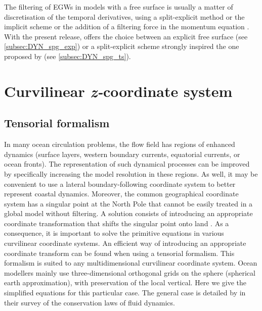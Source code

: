 \documentclass[../main/NEMO_manual]{subfiles}
\begin{document}
The filtering of EGWs in models with a free surface is usually a matter of discretisation of
the temporal derivatives,
using a split-explicit method \citep{Killworth_al_JPO91, Zhang_Endoh_JGR92} or
the implicit scheme \citep{Dukowicz1994} or
the addition of a filtering force in the momentum equation \citep{Roullet_Madec_JGR00}.
With the present release, \NEMO offers the choice between
an explicit free surface (see \autoref{subsec:DYN_spg_exp}) or
a split-explicit scheme strongly inspired the one proposed by \citet{Shchepetkin_McWilliams_OM05}
(see \autoref{subsec:DYN_spg_ts}).

\section{Curvilinear \textit{z-}coordinate system}
\label{sec:PE_zco}

\subsection{Tensorial formalism}
\label{subsec:PE_tensorial}

In many ocean circulation problems, the flow field has regions of enhanced dynamics
(\ie surface layers, western boundary currents, equatorial currents, or ocean fronts).
The representation of such dynamical processes can be improved by
specifically increasing the model resolution in these regions.
As well, it may be convenient to use a lateral boundary-following coordinate system to
better represent coastal dynamics.
Moreover, the common geographical coordinate system has a singular point at the North Pole that
cannot be easily treated in a global model without filtering.
A solution consists of introducing an appropriate coordinate transformation that
shifts the singular point onto land \citep{Madec_Imbard_CD96, Murray_JCP96}.
As a consequence, it is important to solve the primitive equations in various curvilinear coordinate systems.
An efficient way of introducing an appropriate coordinate transform can be found when using a tensorial formalism.
This formalism is suited to any multidimensional curvilinear coordinate system.
Ocean modellers mainly use three-dimensional orthogonal grids on the sphere (spherical earth approximation),
with preservation of the local vertical. Here we give the simplified equations for this particular case.
The general case is detailed by \citet{Eiseman1980} in their survey of the conservation laws of fluid dynamics.
\end{document}
